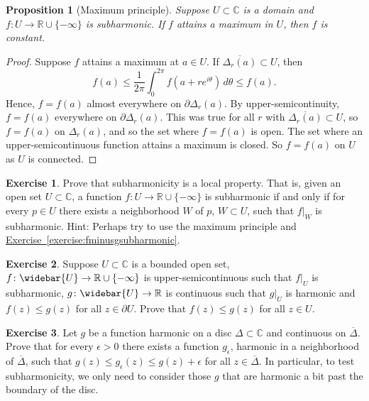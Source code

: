 \documentclass[12pt,openany]{book}
\newcommand{\C}{{\mathbb{C}}}
\newcommand{\R}{{\mathbb{R}}}
\theoremstyle{plain}
\newtheorem{prop}[thm]{Proposition}
\theoremstyle{remark}
\theoremstyle{definition}
\newenvironment{exbox}{%
    \def\FrameCommand{\vrule width 1pt \relax\hspace{10pt}}%
    \MakeFramed{\advance\hsize-\width\FrameRestore}%
}{%
    \endMakeFramed
}
\theoremstyle{exercise}
\newtheorem{exercise}{Exercise}[section]
\theoremstyle{example}
\newcommand{\exerciseref}[1]{\hyperref[#1]{Exercise~\ref*{#1}}}
\begin{document}
\begin{prop}[Maximum principle]
Suppose $U \subset \C$ is a domain and $f \colon U \to \R \cup \{ -\infty \}$
is subharmonic.  If $f$ attains a maximum in $U$, then $f$ is constant.
\end{prop}

\begin{proof}
Suppose $f$ attains a maximum at $a \in U$.
If
$\overline{\Delta_r(a)} \subset U$, then
\begin{equation*}
f(a) \leq \frac{1}{2\pi} \int_0^{2\pi} f(a+re^{i\theta})\, d\theta \leq f(a)
.
\end{equation*}
Hence, $f = f(a)$ almost everywhere on $\partial \Delta_r(a)$.
By upper-semicontinuity, $f = f(a)$ everywhere on $\partial \Delta_r(a)$.
This was true for all $r$
with $\overline{\Delta_r(a)} \subset U$, so $f=f(a)$ on $\Delta_r(a)$,
and so the set where $f=f(a)$ is open.  The set where an upper-semicontinuous
function attains a maximum is closed.  So $f=f(a)$ on $U$ as $U$ is
connected.
\end{proof}

\begin{exbox}
\begin{exercise}
Prove that subharmonicity is a local property.  That is, given an open set
$U \subset \C$, a function $f \colon U \to \R \cup \{ -\infty \}$ is subharmonic if
and only if for every $p \in U$ there exists a neighborhood $W$ of $p$,
$W \subset U$, such that $f|_{W}$ is subharmonic.  Hint: Perhaps try to use
the maximum principle and \exerciseref{exercise:fminusgsubharmonic}.
\end{exercise}

\begin{exercise}
Suppose $U \subset \C$ is a bounded open set, $f \colon \widebar{U} \to \R
\cup \{-\infty\}$ is upper-semicontinuous such that $f|_U$
is subharmonic, $g \colon \widebar{U} \to \R$ is continuous
such that $g|_U$ is harmonic and
$f(z) \leq g(z)$ for all $z \in \partial U$.  Prove that
$f(z) \leq g(z)$ for all $z \in U$.
\end{exercise}

\begin{exercise} \label{exercise:onlyniceuneededforsubharmonic}
Let $g$ be a function
harmonic on a disc $\Delta \subset \C$ and continuous on
$\overline{\Delta}$.  Prove that for every $\epsilon > 0$ there exists
a function $g_\epsilon$, harmonic in a neighborhood of $\overline{\Delta}$,
such that $g(z) \leq g_\epsilon(z) \leq g(z)+\epsilon$ for all $z \in
\overline{\Delta}$.
In particular, to test subharmonicity, we only need to consider those
$g$ that are harmonic a bit past the boundary of the disc.
\end{exercise}
\end{exbox}
\end{document}
